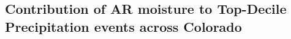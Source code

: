 \documentclass[draft]{agujournal2019}
\begin{document}
\subsection{Contribution of AR moisture to Top-Decile Precipitation events across Colorado}
\label{sec:results:contribution}
\end{document}
